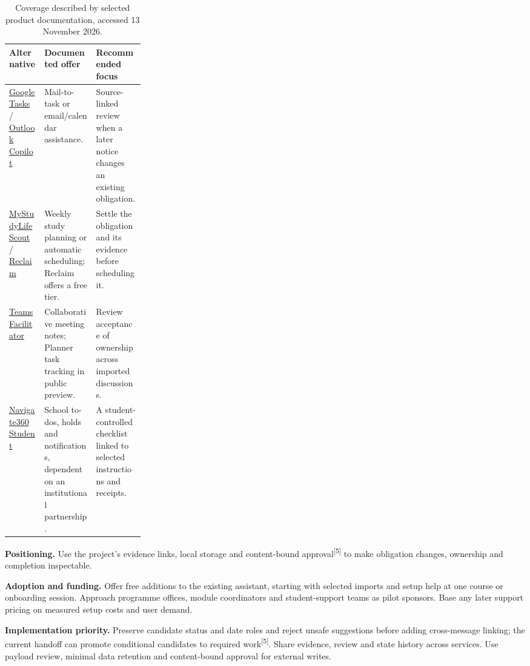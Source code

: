 \documentclass[11pt,a4paper]{article}
\newcommand{\src}[1]{\textsuperscript{[#1]}}
\begin{document}
\begin{table}[!ht]
\centering\small\renewcommand{\arraystretch}{1.12}
\begin{tabularx}{\linewidth}{@{}>{\raggedright\arraybackslash}p{0.26\linewidth}YY@{}}
\toprule
\textbf{Alternative} & \textbf{Documented offer} & \textbf{Recommended focus} \\
\midrule
\href{https://support.google.com/mail/answer/9920317?hl=en}{Google Tasks} / \href{https://support.microsoft.com/en-gb/outlook/frequently-asked-questions-about-copilot-in-outlook}{Outlook Copilot} & Mail-to-task or email/calendar assistance. & Source-linked review when a later notice changes an existing obligation. \\
\href{https://mystudylife.com/}{MyStudyLife Scout} / \href{https://reclaim.ai/pricing}{Reclaim} & Weekly study planning or automatic scheduling; Reclaim offers a free tier. & Settle the obligation and its evidence before scheduling it. \\
\href{https://learn.microsoft.com/en-us/microsoftteams/facilitator-teams}{Teams Facilitator} & Collaborative meeting notes; Planner task tracking in public preview. & Review acceptance of ownership across imported discussions. \\
\href{https://play.google.com/store/apps/details?hl=en-US\&id=com.eab.se}{Navigate360 Student} & School to-dos, holds and notifications, dependent on an institutional partnership. & A student-controlled checklist linked to selected instructions and receipts. \\
\bottomrule
\end{tabularx}
\caption{Coverage described by selected product documentation, accessed 13 November 2026.}
\label{tab:competition}
\end{table}

\textbf{Positioning.} Use the project's evidence links, local storage and
content-bound approval\src{5} to make obligation changes, ownership and
completion inspectable.

\textbf{Adoption and funding.} Offer free additions to the existing assistant,
starting with selected imports and setup help at one course or onboarding
session. Approach programme offices, module coordinators and student-support
teams as pilot sponsors. Base any later support pricing on measured setup costs
and user demand.

\textbf{Implementation priority.} Preserve candidate status and date roles and
reject unsafe suggestions before adding cross-message linking; the current
handoff can promote conditional candidates to required work\src{5}. Share
evidence, review and state history across services. Use payload review, minimal
data retention and content-bound approval for external writes.
\end{document}
